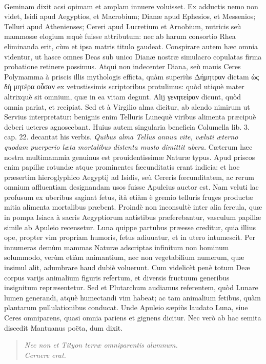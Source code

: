 \documentclass[a4paper, 11pt, oneside, polutonikogreek, latin]{article}
\begin{document}
\paragraph{}
Geminam dixit acsi opimam et amplam innuere voluisset. Ex adductis nemo non videt, Isidi apud Aegyptios, et Macrobium; Dianæ apud Ephesios, et Messenios; Telluri apud Athenienses; Cereri apud Lucretium et Arnobium, nutricis seù mammosæ elogium æquè fuisse attributum: nec ab harum consortio Rhea eliminanda erit, cùm et ipsa matris titulo gaudeat. Conspirare autem hæc omnia videntur, ut hasce omnes Deas sub unico Dianæ nostræ simulacro copulatas firma probatione retinere possimus. Atqui non indecenter Diana, seù mauis Ceres Polymamma à priscis illis mythologis efficta, quàm superiùs Δήμητραν dictam ὡς δὴ μητέρα οὖσαν ex vetustissimis scriptoribus protulimus: quòd utiquè mater altrixquè sit omnium, quæ in ea vitam degunt. Alij γενητείραν dicunt, quòd omnia pariat, et recipiat. Sed et à Virgilio alma dicitur, ab alendo nimirum ut Servius interpretatur: benignis enim Telluris Lunequè viribus alimenta præcipuè deberi ueteres agnoscebant. Huius autem singularia beneficia Columella lib. 3. cap. 22. decantat his verbis. \emph{Quibus alma Tellus annua vite, væluti æterno quodam puerperio læta mortalibus distenta musto dimittit ubera.} Cæterum hæc nostra multimammia genuinus est prouidentissimæ Naturæ typus. Apud priscos enim papillæ rotundæ atque prominentes fæcunditatis erant indicia: et hoc præsertim hieroglyphico Aegyptij ad Isidis, seù Cereris fœcunditatem, ac rerum omnium affluentiam designandam usos fuisse Apuleius auctor est. Nam veluti lac profusum ex uberibus saginat fetus, ità etiàm è gremio telluris fruges productæ mitia alimenta mortalibus præbent. Proindè non inconsultè inter alia fercula, quæ in pompa Isiaca à sacris Aegyptiorum antistibus præferebantur, vasculum papillæ simile ab Apuleio recensetur. Luna quippe partubus præesse creditur, quia illius ope, propter vim propriam humoris, fetus adiuuatur, et in utero intumescit. Per innumeras demùm mammas Naturæ adscriptas infinitum non hominum solummodo, verùm etiàm animantium, nec non vegetabilium numerum, quæ insimul alit, adumbrare haud dubiè voluerunt. Cum videlicèt penè totum Deæ corpus varijs animalium figuris refertum, et diversis fructuum generibus insignitum repræsentetur. Sed et Plutarchum audiamus referentem, quòd Lunare lumen generandi, atquè humectandi vim habeat; ac tam animalium fetibus, quàm plantarum pullulationibus conducat. Unde Apuleio sæpiùs laudato Luna, siue Ceres omniparens, quasi omnia pariens et gignens dicitur. Nec verò ab hac semita discedit Mantuanus poëta, dum dixit.
\begin{quote}
\emph{Nec non et Tityon terræ omniparentis alumnum.}\\
\emph{Cernere erat.}\\
\end{quote}
\vspace*{-8mm}
\end{document}
